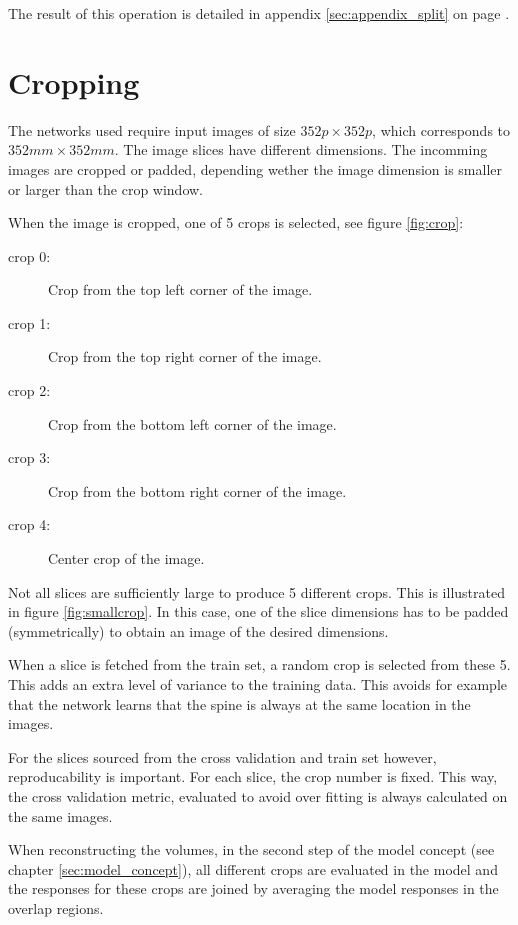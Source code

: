 The result of this operation is detailed in appendix \ref{sec:appendix_split} on page \pageref{sec:appendix_split}.

\section{Cropping}

The networks used require input images of size $352 p \times 352 p$, which corresponds to $352 mm \times 352 mm$.
The image slices have different dimensions.
The incomming images are cropped or padded, depending wether the image dimension is smaller or larger than the crop window.

When the image is cropped, one of 5 crops is selected, see figure \ref{fig:crop}:
\begin{description}
    \item[crop 0:] Crop from the top left corner of the image.
    \item[crop 1:] Crop from the top right corner of the image.
    \item[crop 2:] Crop from the bottom left corner of the image.
    \item[crop 3:] Crop from the bottom right corner of the image.
    \item[crop 4:] Center crop of the image.  
\end{description}

Not all slices are sufficiently large to produce 5 different crops. This is illustrated in figure \ref{fig:smallcrop}. In this case, one of the slice dimensions has to be padded (symmetrically) to obtain an image of the desired dimensions.

When a slice is fetched from the train set, a random crop is selected from these 5.
This adds an extra level of variance to the training data. This avoids for example that the network learns that the spine is always at the same location in the images.

For the slices sourced from the cross validation and train set however, reproducability is important.
For each slice, the crop number is fixed.
This way, the cross validation metric, evaluated to avoid over fitting is always calculated on the same images.

When reconstructing the volumes, in the second step of the model concept (see chapter \ref{sec:model_concept}), 
all different crops are evaluated in the model and the responses for these crops are joined by averaging the model responses in the overlap regions.


